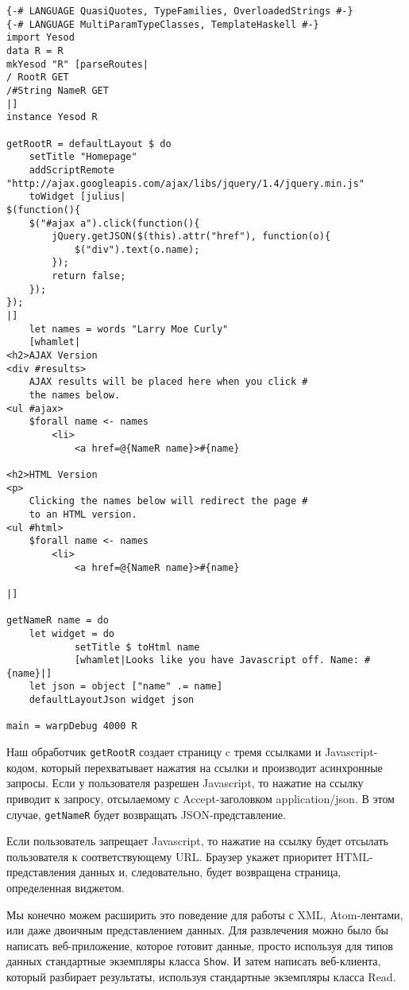 \begin{lstlisting}
{-# LANGUAGE QuasiQuotes, TypeFamilies, OverloadedStrings #-}
{-# LANGUAGE MultiParamTypeClasses, TemplateHaskell #-}
import Yesod
data R = R
mkYesod "R" [parseRoutes|
/ RootR GET
/#String NameR GET
|]
instance Yesod R

getRootR = defaultLayout $ do
    setTitle "Homepage"
    addScriptRemote "http://ajax.googleapis.com/ajax/libs/jquery/1.4/jquery.min.js"
    toWidget [julius|
$(function(){
    $("#ajax a").click(function(){
        jQuery.getJSON($(this).attr("href"), function(o){
            $("div").text(o.name);
        });
        return false;
    });
});
|]
    let names = words "Larry Moe Curly"
    [whamlet|
<h2>AJAX Version
<div #results>
    AJAX results will be placed here when you click #
    the names below.
<ul #ajax>
    $forall name <- names
        <li>
            <a href=@{NameR name}>#{name}

<h2>HTML Version
<p>
    Clicking the names below will redirect the page #
    to an HTML version.
<ul #html>
    $forall name <- names
        <li>
            <a href=@{NameR name}>#{name}

|]

getNameR name = do
    let widget = do
            setTitle $ toHtml name
            [whamlet|Looks like you have Javascript off. Name: #{name}|]
    let json = object ["name" .= name]
    defaultLayoutJson widget json

main = warpDebug 4000 R

\end{lstlisting}

Наш обработчик \lstinline'getRootR' создает страницу c тремя ссылками и Javascript-кодом, который перехватывает нажатия на ссылки и производит асинхронные запросы. Если у пользователя разрешен Javascript, то нажатие на ссылку приводит к запросу, отсылаемому с Accept-заголовком application/json. В этом случае, \lstinline'getNameR' будет возвращать JSON-представление.

Если пользователь запрещает Javascript, то нажатие на ссылку будет отсылать пользователя к соответствующему URL. Браузер укажет приоритет HTML-представления данных и, следовательно, будет возвращена страница, определенная виджетом.

Мы конечно можем расширить это поведение для работы с XML, Atom-лентами, или даже двоичным представлением данных. Для развлечения можно было бы написать веб-приложение, которое готовит данные, просто используя для типов данных стандартные экземпляры класса \lstinline'Show'. И затем написать веб-клиента, который разбирает результаты, используя стандартные экземпляры класса Read.

